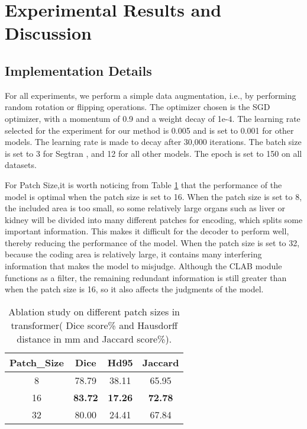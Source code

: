 \documentclass[runningheads]{llncs}
\begin{document}
\section{Experimental Results and Discussion}
\label{sec4}

\subsection{Implementation Details}
\label{sec4.1}
For all experiments, we perform a simple data augmentation, i.e., by performing random rotation or flipping operations. The optimizer chosen is the SGD optimizer, with a momentum of 0.9 and a weight decay of 1e-4. The learning rate selected for the experiment for our method is 0.005 and is set to 0.001 for other models. The learning rate is made to decay after 30,000 iterations. The batch size is set to 3 for Segtran \cite{zheng2021rethinking}, and 12 for all other models. The epoch is set to 150 on all datasets.

For Patch Size,it is worth noticing from Table \ref{table7} that the performance of the model is optimal when the patch size is set to 16. When the patch size is set to 8, the included area is too small, so some relatively large organs such as liver or kidney will be divided into many different patches for encoding, which splits some important information. This makes it difficult for the decoder to perform well, thereby reducing the performance of the model. When the patch size is set to 32, because the coding area is relatively large, it contains many interfering information that makes the model to misjudge. Although the CLAB module functions as a filter, the remaining redundant information is still greater than when the patch size is 16, so it also affects the judgments of the model.
\begin{table}[H]\centering
\caption{Ablation study on different patch sizes in transformer( Dice score\% and Hausdorff distance in mm and Jaccard score\%).}
\label{table7}
\begin{tabular}{c|c|c|c}
\hline
    Patch\_Size & Dice           & Hd95           & Jaccard        \\ \hline
    8           & 78.79          & 38.11          & 65.95          \\
    16          & \textbf{83.72} & \textbf{17.26} & \textbf{72.78} \\
    32          & 80.00          & 24.41          & 67.84         \\ \hline
    \end{tabular}
\end{table}
\end{document}
